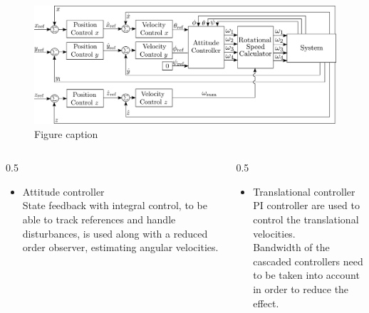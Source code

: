 \begin{figure}
	\includegraphics[width=0.7\linewidth]{figures/TranslationalControlDiagram}
	\caption{Figure caption}
\end{figure}


\begin{columns}[t,totalwidth=\twocolwid] %

	\begin{column}{0.5\twocolwid} %
  	 \centering
  	 \vspace{.5cm}
  	 \parbox{.95\textwidth}{
    	 \begin{itemize}
  	 			\item Attitude controller\\
  	 			State feedback with integral control, to be able to track references and handle disturbances, is used along with a reduced order observer, estimating angular velocities.
  	 		\end{itemize}
  	 }\vspace{.5cm}
	\end{column} %
	
	\begin{column}{0.5\twocolwid} %
  	 \centering
   	 \vspace{.5cm}
   	 \parbox{.9\textwidth}{
       	 \begin{itemize}
    	 			\item Translational controller\\
     	 			PI controller are used to control the translational velocities.\\
     	 			Bandwidth of the cascaded controllers need to be taken into account in order to reduce the effect.
       	 \end{itemize}		
   	 }\vspace{.5cm}
	\end{column} %
	
\end{columns} %